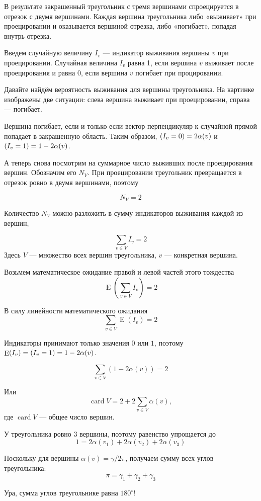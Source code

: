 \documentclass[12pt]{article} %
\theoremstyle{definition} %
\DeclareMathOperator{\E}{E}
\DeclareMathOperator{\card}{card}
\let\P\relax
\DeclareMathOperator{\P}{P}
\begin{document}
В результате закрашенный треугольник с тремя вершинами спроецируется в отрезок с двумя вершинами.
Каждая вершина треугольника либо «выживает» при проецировании и оказывается вершиной отрезка,
либо «погибает», попадая внутрь отрезка.


Введем случайную величину $I_v$ — индикатор выживания вершины $v$ при проецировании.
Случайная величина $I_v$ равна 1, если вершина $v$ выживает после проецирования и равна 0, если 
вершина $v$ погибает при процировании. 

Давайте найдём вероятность выживания для вершины треугольника.
На картинке изображены две ситуации: слева вершина выживает при проецировании, справа — погибает.


Вершина погибает, если и только если вектор-перпендикуляр к случайной прямой попадает в закрашенную область.
Таким образом, $\P(I_v = 0) = 2 \alpha(v)$ и $\P(I_v = 1) = 1 - 2\alpha(v)$.

А теперь снова посмотрим на суммарное число выживших после проецирования вершин.
Обозначим его $N_V$. 
При проецировании треугольник превращается в отрезок ровно в двумя вершинами, поэтому

\[
N_V = 2
\]

Количество $N_V$ можно разложить в сумму индикаторов выживания каждой из вершин,

\[
\sum_{v \in V} I_v = 2
\]
Здесь $V$ — множество всех вершин треугольника, $v$ — конкретная вершина.


Возьмем математическое ожидание правой и левой частей этого тождества
\[
\E(\sum_{v \in V} I_v) = 2
\]

В силу линейности математического ожидания
\[
\sum_{v\in V} \E(I_v) = 2
\]

Индикаторы принимают только значения $0$ или $1$, поэтому $\E(I_v) = \P(I_v = 1) = 1 - 2\alpha(v)$.

\[
\sum_{v\in V} (1 - 2\alpha(v)) = 2
\]

Или 
\[
\card V = 2 + 2 \sum_{v\in V} \alpha(v), 
\]
где $\card V$ — общее число вершин.

У треугольника ровно 3 вершины, поэтому равенство упрощается до
\[
1 = 2\alpha(v_1) + 2\alpha(v_2) + 2\alpha(v_3)
\]

Поскольку для вершины $\alpha(v) = \gamma / 2\pi$, получаем сумму всех углов треугольника:
\[
\pi = \gamma_1 + \gamma_2 + \gamma_3
\]

Ура, сумма углов треугольнике равна $180^{\circ}$!
\end{document}
